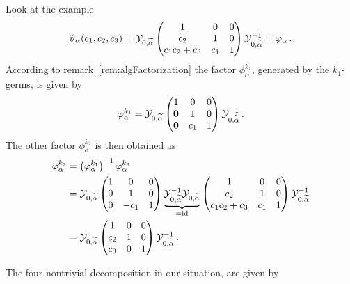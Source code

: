 \begin{exmp}\label{exmp:decompositionHere}
  Look at the example
  \[
    \vartheta_\alpha(c_1,c_2,c_3)=
    \mathcal{Y}_{0,\widetilde\alpha}
    \begin{pmatrix} 1 & 0 & 0 \\c_2 & 1 & 0 \\c_1c_2+c_3 & c_1 & 1 \end{pmatrix}
    \mathcal{Y}_{0,\widetilde\alpha}^{-1}
    =\varphi_\alpha
    \,.
  \]
  According to remark~\ref{rem:algFactorization} the factor
  $\phi_\alpha^{k_1}$, generated by the $k_1$-germs, is given by
  \[
    \varphi_\alpha^{k_1}=
    \mathcal{Y}_{0,\widetilde\alpha}
    \begin{pmatrix}
      1 & 0 & 0
    \\\text{\boldmath $0$} & 1 & 0
    \\\text{\boldmath $0$} & c_1 & 1
    \end{pmatrix}
    \mathcal{Y}_{0,\widetilde\alpha}^{-1}
    \,.
  \]
  The other factor $\phi_\alpha^{k_2}$ is then obtained as
  \begin{align*}
    \phi_\alpha^{k_2}&=
    \left(\phi_\alpha^{k_1}\right)^{-1}
    \phi_\alpha^{k_2}
  \\&=\cY_{0,\tilde\alpha}
    \begin{pmatrix}
      1     & 0    & 0
    \\0     & 1    & 0
    \\0     & -c_1 & 1
    \end{pmatrix}
    \underset{=\id}{\underbrace{%
        \cY_{0,\tilde\alpha}^{-1}
        \cY_{0,\tilde\alpha}
    }}
    \begin{pmatrix} 1 & 0 & 0 \\c_2 & 1 & 0 \\c_1c_2+c_3 & c_1 & 1 \end{pmatrix}
    \cY_{0,\tilde\alpha}^{-1}
  \\&=\cY_{0,\tilde\alpha}
    \begin{pmatrix}
      1     & 0 & 0
    \\c_2     & 1          & 0
    \\c_3     & 0          & 1
    \end{pmatrix}
    \cY_{0,\tilde\alpha}^{-1}
    \,.
  \end{align*}
\end{exmp}
The four nontrivial decomposition in our situation, are given by
